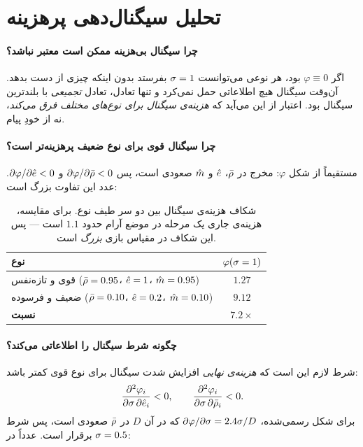 \documentclass[12pt,a4paper]{article}
\begin{document}
\section{تحلیل سیگنال‌دهی پرهزینه}\label{sec:signal}

\paragraph{چرا سیگنال بی‌هزینه ممکن است معتبر نباشد؟}
اگر $\varphi\equiv0$ بود، هر نوعی می‌توانست $\sigma=1$ بفرستد بدون اینکه چیزی
از دست بدهد. آن‌وقت سیگنال هیچ اطلاعاتی حمل نمی‌کرد و تنها تعادل، تعادل
\emph{تجمیعی} با بلندترین سیگنال بود. اعتبار از این می‌آید که \emph{هزینه‌ی
سیگنال برای نوع‌های مختلف فرق می‌کند}، نه از خودِ پیام.

\paragraph{چرا سیگنال قوی برای نوع ضعیف پرهزینه‌تر است؟}
مستقیماً از شکل $\varphi$: مخرج در $\bar{\rho}$، $\hat{e}$ و $\hat{m}$ صعودی است، پس
$\partial\varphi/\partial\bar{\rho}<0$ و $\partial\varphi/\partial\hat{e}<0$.
عدد این تفاوت بزرگ است:

\begin{table}[h]\centering
\begin{tabular}{lc}
\toprule
نوع & $\varphi(\sigma=1)$\\
\midrule
قوی و تازه‌نفس ($\bar{\rho}=0.95$، $\hat{e}=1$، $\hat{m}=0.95$) & $1.27$\\
ضعیف و فرسوده ($\bar{\rho}=0.10$، $\hat{e}=0.2$، $\hat{m}=0.10$) & $9.12$\\
\midrule
\textbf{نسبت} & $\mathbf{7.2\times}$\\
\bottomrule
\end{tabular}
\caption{شکاف هزینه‌ی سیگنال بین دو سر طیف نوع. برای مقایسه، هزینه‌ی جاری
یک مرحله در موضع آرام حدود $1.1$ است — پس این شکاف در مقیاس بازی
\emph{بزرگ} است.}
\end{table}

\paragraph{چگونه شرط  سیگنال را اطلاعاتی می‌کند؟}
شرط لازم این است که \emph{هزینه‌ی نهایی} افزایش شدت سیگنال برای نوع قوی
کمتر باشد:
\[
  \frac{\partial^2\varphi_i}{\partial\sigma\,\partial\hat{e}_i}<0,
  \qquad
  \frac{\partial^2\varphi_i}{\partial\sigma\,\partial\bar{\rho}_i}<0 .
\]
برای شکل رسمی‌شده، $\partial\varphi/\partial\sigma=2.4\sigma/D$ که در آن $D$ در
$\bar{\rho}$ صعودی است، پس شرط برقرار است. عدداً در $\sigma=0.5$:
\end{document}

